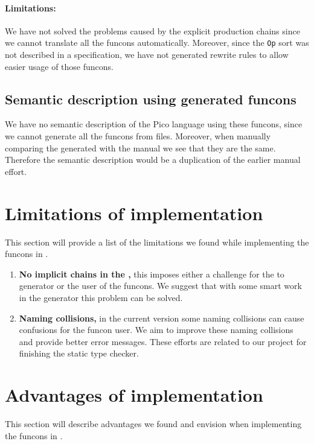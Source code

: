 \documentclass[a4paper, oneside, notitlepage]{article}
\newcommand{\CSF}{\textsmaller{CSF}\xspace}
\newcommand{\ADT}{\textsmaller{ADT}\xspace}
\newcommand{\ADTs}{\textsmaller{ADTs}\xspace}
\newcommand{\code}[1]{\texttt{#1}\xspace}
\begin{document}
	\paragraph{Limitations:}
	We have not solved the problems caused by the explicit production chains
	since we cannot translate all the funcons automatically.
	Moreover, since the \code{Op} sort was not described in a \CSF
	specification, we have not generated rewrite rules to allow easier usage of
	those funcons.

	\subsection{Semantic description using generated funcons}
	We have no semantic description of the Pico language using these funcons,
	since we cannot generate all the funcons from \CSF files.
	Moreover, when manually comparing the generated \ADT with the manual \ADT we
	see that they are the same.
	Therefore the semantic description would be a duplication of the earlier
	manual effort.

\section{Limitations of \Rascal implementation}
This section will provide a list of the limitations we found while implementing
the funcons in \Rascal.

\begin{enumerate}
	\newcommand{\limit}[2]{\item \textbf{#1,} #2}
	\limit
		{No implicit chains in the \ADTs}
		{
			this imposes either a challenge for the \CSF to \Rascal generator or
			the user of the funcons.
			We suggest that with some smart work in the \Rascal generator this
			problem can be solved.
		}

	\limit
		{Naming collisions}
		{
			in the current version some naming collisions can cause confusions
			for the funcon user.
			We aim to improve these naming collisions and provide better error
			messages.
			These efforts are related to our project for finishing the static type
			checker.
		}
	
\end{enumerate}

\section{Advantages of \Rascal implementation}

This section will describe advantages we found and envision when implementing
the funcons in \Rascal.
\end{document}
